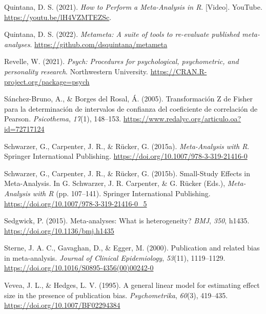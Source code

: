 \documentclass[
  bookmarksnumbered]{article}
\newlength{\cslhangindent}
\newlength{\cslentryspacingunit} %
\newenvironment{CSLReferences}[2] %
 {%
  \setlength{\parindent}{0pt}
  \ifodd #1
  \let\oldpar\par
  \def\par{\hangindent=\cslhangindent\oldpar}
  \fi
  \setlength{\parskip}{#2\cslentryspacingunit}
 }%
 {}
\begin{document}
\begin{CSLReferences}{1}{0}
\leavevmode{}%
Quintana, D. S. (2021). \emph{{How to Perform a Meta-Analysis in R}}. {[}Video{]}. YouTube. \url{https://youtu.be/lH4VZMTEZSc}.

\leavevmode{}%
Quintana, D. S. (2022). \emph{Metameta: A suite of tools to re-evaluate published meta-analyses}. \url{https://github.com/dsquintana/metameta}

\leavevmode{}%
Revelle, W. (2021). \emph{Psych: Procedures for psychological, psychometric, and personality research}. Northwestern University. \url{https://CRAN.R-project.org/package=psych}

\leavevmode{}%
Sánchez-Bruno, A., \& Borges del Rosal, Á. (2005). {Transformación Z de Fisher para la determinación de intervalos de confianza del coeficiente de correlación de Pearson}. \emph{Psicothema}, \emph{17}(1), 148--153. \url{https://www.redalyc.org/articulo.oa?id=72717124}

\leavevmode{}%
Schwarzer, G., Carpenter, J. R., \& Rücker, G. (2015a). \emph{Meta-{Analysis} with {R}}. {Springer International Publishing}. \url{https://doi.org/10.1007/978-3-319-21416-0}

\leavevmode{}%
Schwarzer, G., Carpenter, J. R., \& Rücker, G. (2015b). Small-{Study Effects} in {Meta}-{Analysis}. In G. Schwarzer, J. R. Carpenter, \& G. Rücker (Eds.), \emph{Meta-{Analysis} with {R}} (pp. 107--141). {Springer International Publishing}. \url{https://doi.org/10.1007/978-3-319-21416-0_5}

\leavevmode{}%
Sedgwick, P. (2015). Meta-analyses: What is heterogeneity? \emph{BMJ}, \emph{350}, h1435. \url{https://doi.org/10.1136/bmj.h1435}

\leavevmode{}%
Sterne, J. A. C., Gavaghan, D., \& Egger, M. (2000). Publication and related bias in meta-analysis. \emph{Journal of Clinical Epidemiology}, \emph{53}(11), 1119--1129. \url{https://doi.org/10.1016/S0895-4356(00)00242-0}

\leavevmode{}%
Vevea, J. L., \& Hedges, L. V. (1995). A general linear model for estimating effect size in the presence of publication bias. \emph{Psychometrika}, \emph{60}(3), 419--435. \url{https://doi.org/10.1007/BF02294384}


\end{CSLReferences}
\end{document}
